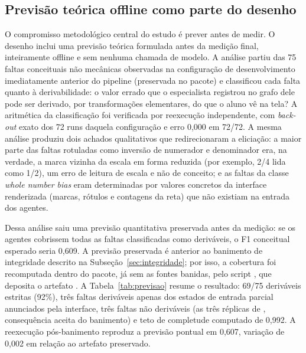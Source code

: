 \documentclass[11pt,a4paper]{article}
\begin{document}
\subsection{Previsão teórica offline como parte do desenho}
\label{sec:previsao}

O compromisso metodológico central do estudo é prever antes de medir. O desenho inclui uma previsão teórica formulada antes da medição final, inteiramente offline e sem nenhuma chamada de modelo. A análise partiu das 75 faltas conceituais não mecânicas observadas na configuração de desenvolvimento imediatamente anterior do pipeline (preservada no pacote) e classificou cada falta quanto à derivabilidade: o valor errado que o especialista registrou no grafo dele pode ser derivado, por transformações elementares, do que o aluno vê na tela? A aritmética da classificação foi verificada por reexecução independente, com \emph{back-out} exato dos 72 runs daquela configuração e erro 0,000 em 72/72. A mesma análise produziu dois achados qualitativos que redirecionaram a eliciação: a maior parte das faltas rotuladas como inversão de numerador e denominador era, na verdade, a marca vizinha da escala em forma reduzida (por exemplo, 2/4 lida como 1/2), um erro de leitura de escala e não de conceito; e as faltas da classe \emph{whole number bias} eram determinadas por valores concretos da interface renderizada (marcas, rótulos e contagens da reta) que não existiam na entrada dos agentes.

Dessa análise saiu uma previsão quantitativa preservada antes da medição: se os agentes cobrissem todas as faltas classificadas como deriváveis, o F1 conceitual esperado seria 0,609. A previsão preservada é anterior ao banimento de integridade descrito na Subseção~\ref{sec:integridade}; por isso, a cobertura foi recomputada dentro do pacote, já sem as fontes banidas, pelo script , que deposita o artefato . A Tabela~\ref{tab:previsao} resume o resultado: 69/75 deriváveis estritas (92\%), três faltas deriváveis apenas dos estados de entrada parcial anunciados pela interface, três faltas não deriváveis (as três réplicas de , consequência aceita do banimento) e teto de completude computado de 0,992. A reexecução pós-banimento reproduz a previsão pontual em 0,607, variação de 0,002 em relação ao artefato preservado.
\end{document}
